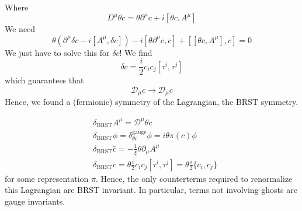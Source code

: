 \documentclass[a4paper]{book}
\theoremstyle{definition}
\theoremstyle{remark}
\begin{document}
Where 
\begin{equation}
    D^\mu \theta c = \theta \partial^\mu c + i[\theta c, A^\mu]
\end{equation}
We need 
\begin{equation}
    \theta (\partial^\mu \delta c - i[A^\mu, \delta c ]) -i[\theta \partial^\mu c, c] + [[\theta c, A^\mu], c] = 0
\end{equation}
We just have to solve this for $\delta c$! We find 
\begin{equation}
    \delta c = \frac{i}{2} c_i c_j [\tau^i, \tau^j]
\end{equation}
which guarantees that 
\begin{equation}
    \mathcal D_\mu c \rightarrow \mathcal D_\mu c
\end{equation}
Hence, we found a (fermionic) symmetry of the Lagrangian, the BRST symmetry.

\begin{equation}
    \begin{aligned}
        &\delta_{\text{BRST}}A^\mu = \mathcal D^\mu \theta c \\ 
        &\delta_{\text{BRST}} \phi = \delta_{\theta c}^{\text{gauge} }\phi = i \theta \pi(c) \phi \\ 
        &\delta_{\text{BRST}} \bar{c} = -\frac{1}{\xi} \theta \partial_\mu A^\mu \\
        &\delta_{\text{BRST}} c = \theta  \frac{i}{2} c_i c_j [\tau^i, \tau^j] = \theta  \frac{i}{2} \{c_i, c_j\} 
    \end{aligned}
\end{equation}
for some representation $\pi$. Hence, the only counterterms required to renormalize this Lagrangian are BRST invariant. In particular, terms not involving ghosts are gauge invariants. 
\end{document}
